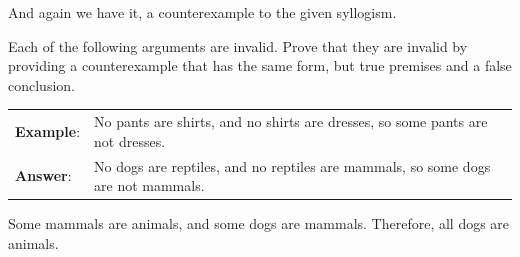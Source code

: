 {And again we have it, a counterexample to the given syllogism. 

\practiceproblems

\noindent\problempart Each of the following arguments are invalid. Prove that they are invalid by providing a counterexample that has the same form, but true premises and a false conclusion. 
\begin{longtabu}{p{.1\linewidth}p{.9\linewidth}} 
\textbf{Example}: & No pants are shirts, and no shirts are dresses, so some pants are not dresses. \\ 
\textbf{Answer}: & No dogs are reptiles, and no reptiles are mammals, so some dogs are not mammals.   \\ 
\end{longtabu} 

% 



\begin{exercises} 

\item Some mammals are animals, and some dogs are mammals. Therefore, all dogs are animals.  

 

\end{exercises}}
